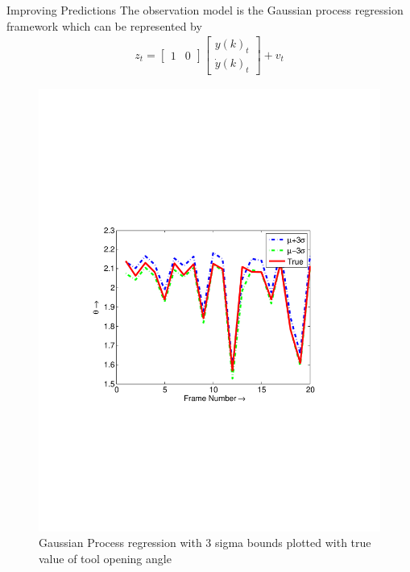 \begin{frame}{Improving Predictions}
The observation model is the Gaussian process regression framework which can be represented by 
\begin{align}
z_t = \begin{bmatrix}
1&0
\end{bmatrix}\begin{bmatrix}
y(k)_{t}\\
\dot{y}(k)_{t}
\end{bmatrix}+v_t \label{eq:state_obs}
\end{align}
\begin{figure}
\centering
\includegraphics[width = 0.5\linewidth,trim= 20mm 80mm 35mm 85mm,clip]{figures/surgical/gaussian_estimation_1}
\caption{Gaussian Process regression with 3 sigma bounds plotted with true value of tool opening angle}\label{fig:three_sigma}
\end{figure}
\end{frame}

